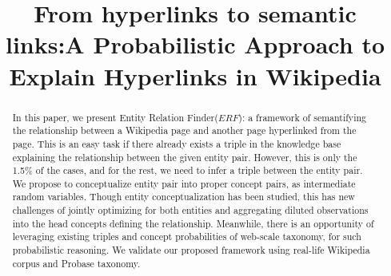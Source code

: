 \documentclass[letterpaper]{article}
\begin{document}
\title{From hyperlinks to semantic links:A Probabilistic Approach to Explain Hyperlinks in Wikipedia}




\maketitle
\begin{abstract}

In this paper, we present Entity Relation Finder($ERF$): a framework of semantifying 
the relationship between a Wikipedia page and another page hyperlinked from the page.
This is an easy task if there already exists a triple in the knowledge base explaining the relationship
between the given entity pair.
However, this is only the 1.5\% of the cases, and for the rest, we need to infer a triple between the entity pair.
We propose to conceptualize entity pair into proper concept pairs, as intermediate random variables.
Though entity conceptualization has been studied, this has new challenges of jointly optimizing for both entities and aggregating diluted observations into the head concepts defining the relationship.
Meanwhile, there is an opportunity of leveraging existing triples and concept probabilities of web-scale taxonomy, for such probabilistic reasoning.
We validate our proposed framework using real-life Wikipedia corpus and Probase taxonomy.

\end{abstract}






%


\newpage	


%

\end{document}
